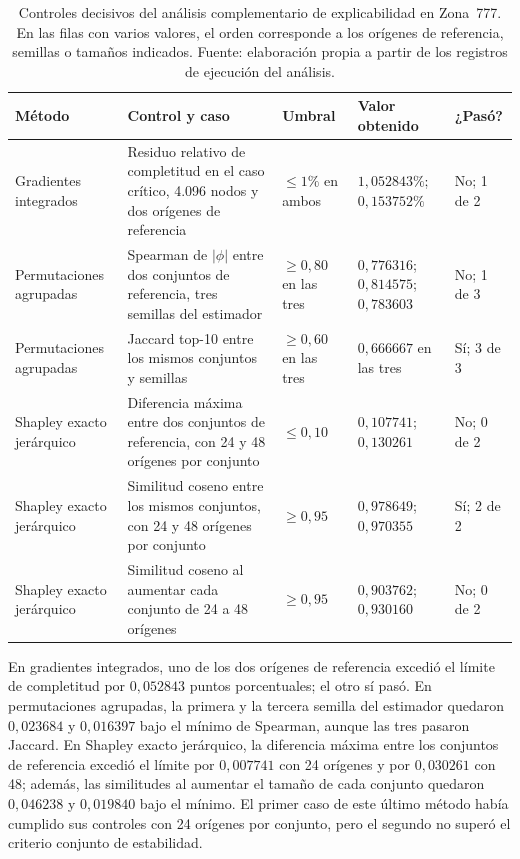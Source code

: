 \begin{table}[H]
\centering
\footnotesize
\setlength{\tabcolsep}{3pt}
\renewcommand{\arraystretch}{1.15}
\caption{Controles decisivos del análisis complementario de explicabilidad en Zona~777. En las filas con varios valores, el orden corresponde a los orígenes de referencia, semillas o tamaños indicados. Fuente: elaboración propia a partir de los registros de ejecución del análisis.}
\label{tab:controles_xai}
\begin{tabularx}{\textwidth}{@{}p{2.25cm}p{3.5cm}p{2.75cm}Xp{1.15cm}@{}}
\toprule
\textbf{Método} & \textbf{Control y caso} & \textbf{Umbral} & \textbf{Valor obtenido} & \textbf{¿Pasó?} \\
\midrule
Gradientes integrados & Residuo relativo de completitud en el caso crítico, 4.096 nodos y dos orígenes de referencia & $\leq 1\%$ en ambos & $1{,}052843\%$; $0{,}153752\%$ & No; 1 de 2 \\
\addlinespace
Permutaciones agrupadas & Spearman de $|\phi|$ entre dos conjuntos de referencia, tres semillas del estimador & $\geq 0{,}80$ en las tres & $0{,}776316$; $0{,}814575$; $0{,}783603$ & No; 1 de 3 \\
Permutaciones agrupadas & Jaccard top-10 entre los mismos conjuntos y semillas & $\geq 0{,}60$ en las tres & $0{,}666667$ en las tres & Sí; 3 de 3 \\
\addlinespace
Shapley exacto jerárquico & Diferencia máxima entre dos conjuntos de referencia, con 24 y 48 orígenes por conjunto & $\leq 0{,}10$ & $0{,}107741$; $0{,}130261$ & No; 0 de 2 \\
Shapley exacto jerárquico & Similitud coseno entre los mismos conjuntos, con 24 y 48 orígenes por conjunto & $\geq 0{,}95$ & $0{,}978649$; $0{,}970355$ & Sí; 2 de 2 \\
Shapley exacto jerárquico & Similitud coseno al aumentar cada conjunto de 24 a 48 orígenes & $\geq 0{,}95$ & $0{,}903762$; $0{,}930160$ & No; 0 de 2 \\
\bottomrule
\end{tabularx}
\end{table}

En gradientes integrados, uno de los dos orígenes de referencia excedió el límite de completitud por $0{,}052843$ puntos porcentuales; el otro sí pasó. En permutaciones agrupadas, la primera y la tercera semilla del estimador quedaron $0{,}023684$ y $0{,}016397$ bajo el mínimo de Spearman, aunque las tres pasaron Jaccard. En Shapley exacto jerárquico, la diferencia máxima entre los conjuntos de referencia excedió el límite por $0{,}007741$ con 24 orígenes y por $0{,}030261$ con 48; además, las similitudes al aumentar el tamaño de cada conjunto quedaron $0{,}046238$ y $0{,}019840$ bajo el mínimo. El primer caso de este último método había cumplido sus controles con 24 orígenes por conjunto, pero el segundo no superó el criterio conjunto de estabilidad.

